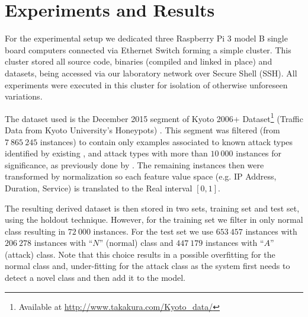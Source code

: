 
\section{Experiments and Results}
\label{sec:experiments}


For the experimental setup we dedicated three Raspberry Pi 3 model B single
board computers connected via Ethernet Switch forming a simple cluster.
This cluster stored all source code, binaries (compiled and linked in place) and
datasets, being accessed via our laboratory network over Secure Shell (SSH).
All experiments were executed in this cluster for isolation of otherwise unforeseen
variations.

The dataset used is the December 2015 segment of
Kyoto 2006+ Dataset\footnote{Available at \url{http://www.takakura.com/Kyoto\_data/}}
(Traffic Data from Kyoto University's Honeypots)
\cite{Song2011}.
This segment was filtered (from $7\:865\:245$ instances) to contain only examples
associated to known attack types identified by existing \nids, and attack types
with more than $10\:000$ instances for significance, as previously done by
\cite{Cassales2019a}.
The remaining instances then were transformed by normalization so
each feature value space (e.g. IP Address, Duration, Service) 
is translated to the Real interval $[0, 1]$.

The resulting derived dataset is then stored in two sets,
training set and test set, using the holdout technique.
However, for the training set we filter in only normal class
resulting in $72\:000$ instances.
For the test set we use $653\:457$ instances with
$206\:278$ instances with ``$N$'' (normal) class and
$447\:179$ instances with ``$A$'' (attack) class.
Note that this choice results in a possible overfitting for the normal class and,
under-fitting for the attack class as the system first needs to detect a novel class and
then add it to the model.

